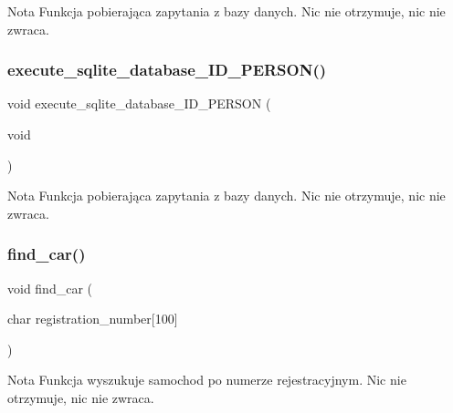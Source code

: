 \begin{DoxyCode}{0}
\end{DoxyCode}
 \begin{DoxyNote}{Nota}
Funkcja pobierająca zapytania z bazy danych. Nic nie otrzymuje, nic nie zwraca. 
\end{DoxyNote}
\mbox{\label{client__management_8hpp_a52e671a6e00226712f96fc23d3d3cd36}} 
\subsubsection{execute\_sqlite\_database\_ID\_PERSON()}
{\footnotesize\ttfamily void execute\+\_\+sqlite\+\_\+database\+\_\+\+I\+D\+\_\+\+P\+E\+R\+S\+ON (\begin{DoxyParamCaption}\item[{void}]{ }\end{DoxyParamCaption})}


\begin{DoxyCode}{0}
\end{DoxyCode}
 \begin{DoxyNote}{Nota}
Funkcja pobierająca zapytania z bazy danych. Nic nie otrzymuje, nic nie zwraca. 
\end{DoxyNote}
\mbox{\label{client__management_8hpp_afcc85d031f9b558083d8caf183b388b4}} 
\subsubsection{find\_car()}
{\footnotesize\ttfamily void find\+\_\+car (\begin{DoxyParamCaption}\item[{char}]{registration\+\_\+number[100] }\end{DoxyParamCaption})}


\begin{DoxyCode}{0}
\end{DoxyCode}
 \begin{DoxyNote}{Nota}
Funkcja wyszukuje samochod po numerze rejestracyjnym. Nic nie otrzymuje, nic nie zwraca.
\end{DoxyNote}


